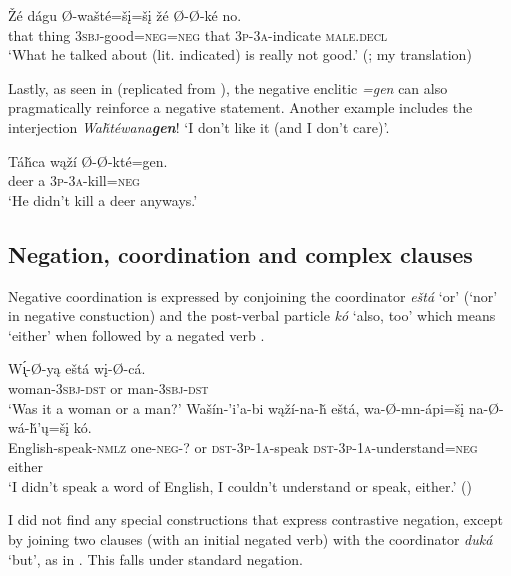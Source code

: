 \documentclass[output=paper,colorlinks,citecolor=brown]{langscibook}
\begin{document}
\ea\label{ex:nak:73}
    \gll Žé dágu Ø-wašté=šį=šį žé Ø-Ø-ké no. \\
         that thing \textsc{3sbj}-good=\textsc{neg=neg} that \textsc{3p-3a}-indicate \textsc{male.decl} \\
    \glt ‘What he talked about (lit. indicated) is really not good.’ (\citealt[115--116]{ParksDeMallie2012b}; my translation)
\z 

Lastly, as seen in  (replicated from ), the negative enclitic \textit{=gen} can also pragmatically reinforce a negative statement. Another example includes the interjection \textit{Waȟtéwana\textbf{gen}}! ‘I don’t like it (and I don’t care)’.

\ea\label{ex:nak:74}
    \gll Táȟca wąží Ø-Ø-kté=gen. \\ 
         deer a \textsc{3p-3a}-kill=\textsc{neg} \\ 
    \glt ‘He didn’t kill a deer anyways.’
\z 

\subsection{Negation, coordination and complex clauses}\label{sec:nak:4.4}

Negative coordination is expressed by conjoining the coordinator \textit{eštá} ‘or’ (‘nor’ in negative constuction)  and the post-verbal particle \textit{kó} ‘also, too’ which means ‘either’ when followed by a negated verb .

\ea\label{ex:nak:75}
    \ea\label{ex:nak:75a}
        \gll W\'{\k{ı}}-Ø-yą eštá wį-Ø-cá. \\
             woman-\textsc{3sbj-dst} or man-\textsc{3sbj-dst} \\
        \glt ‘Was it a woman or a man?’
    \ex\label{ex:nak:75b}
        \gll Wašín-’i’a-bi wąží-na-ȟ eštá, wa-Ø-mn-ápi=šį na-Ø-wá-ȟ’ų=šį kó. \\
             English-speak-\textsc{nmlz} one-\textsc{neg-?} or \textsc{dst-3p-1a}-speak \textsc{dst-3p-1a}-understand=\textsc{neg} either\\
        \glt ‘I didn’t speak a word of English, I couldn’t understand or speak, either.’ (\citealt[127]{ParksDeMallie2012b})
    \z
\z 

I did not find any special constructions that express contrastive negation, except by joining two clauses (with an initial negated verb) with the coordinator \textit{duká} ‘but’, as in . This falls under standard negation.
\end{document}

